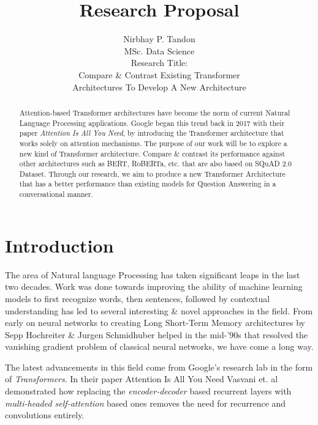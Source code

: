\documentclass[11pt]{article}
\begin{document}
\title{Research Proposal}

\author{Nirbhay P. Tandon\\MSc. Data Science\\
    Research Title:\\Compare \& Contrast Existing Transformer\\ Architectures To Develop A New Architecture
}
\date{}
\maketitle


\begin{abstract}
Attention-based Transformer architectures have become the norm of current Natural Language Processing applications. Google began this trend back in 2017 with their paper \textit{Attention Is All You Need}\cite{atayl}, by introducing the Transformer architecture that works solely on attention mechanisms. The purpose of our work will be to explore a new kind of Transformer architecture. Compare \& contrast its performance against other architectures such as BERT\cite{bert}, RoBERTa\cite{roberta}, etc. that are also based on SQuAD 2.0 Dataset\cite{dataset}. Through our research, we aim to produce a new Transformer Architecture that has a better performance than existing models for Question Answering in a conversational manner.
\end{abstract}
\newpage
\tableofcontents
\newpage
\section{Introduction}\label{introduction}

The area of Natural language Processing has taken significant leaps in the last two decades. Work was done towards improving the ability of machine learning models to first recognize words, then sentences, followed by contextual understanding has led to several interesting \& novel approaches in the field. From early on neural networks to creating Long Short-Term Memory architectures\cite{originallstm} by Sepp Hochreiter \& Jurgen Schmidhuber helped in the mid-'90s that resolved the vanishing gradient problem of classical neural networks, we have come a long way.

The latest advancements in this field come from Google's research lab in the form of \textit{Transformers}\cite{atayl}. In their paper Attention Is All You Need\cite{atayl} Vasvani et. al demonstrated how replacing the \textit{encoder-decoder} based recurrent layers with \textit{multi-headed self-attention} based ones removes the need for recurrence and convolutions entirely.
\end{document}
